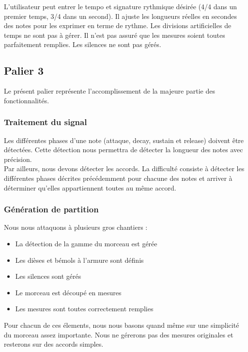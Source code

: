 \documentclass[12pt]{article}
\begin{document}
L'utilisateur peut entrer le tempo et signature rythmique désirée (4/4 dans un premier temps, 3/4 dans un second). Il ajuste les longueurs réelles en secondes des notes pour les exprimer en terme de rythme. Les divisions artificielles de temps ne sont pas à gérer. Il n’est pas assuré que les mesures soient toutes parfaitement remplies. Les silences ne sont pas gérés.

\newpage
\subsection{Palier 3}

Le présent palier représente l’accomplissement de la majeure partie des fonctionnalités.\\

\subsubsection{Traitement du signal}

Les différentes phases d’une note (attaque, decay, sustain et release) doivent être détectées. Cette détection nous permettra de détecter la longueur des notes avec précision.\\

Par ailleurs, nous devons détecter les accords. La difficulté consiste à détecter les différentes phases décrites précédemment pour chacune des notes et arriver à déterminer qu'elles appartiennent toutes au même accord.

\subsubsection{Génération de partition}

Nous nous attaquons à plusieurs gros chantiers :

\begin{itemize}
\item La détection de la gamme du morceau est gérée
\item Les dièses et bémols à l’armure sont définis
\item Les silences sont gérés
\item Le morceau est découpé en mesures
\item Les mesures sont toutes correctement remplies\\
\end{itemize}

Pour chacun de ces élements, nous nous basons quand même sur une simplicité du morceau assez importante. Nous ne gérerons pas des mesures originales et resterons sur des accords simples.
\end{document}
